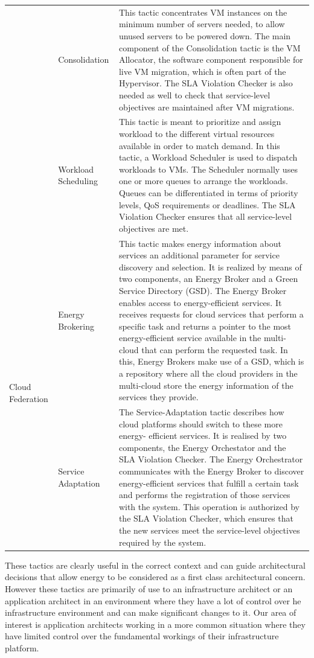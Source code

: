 \begin{small}
\begin{longtable}{| l | l | p{8cm} |}
& Consolidation & This tactic concentrates VM instances on the minimum number of servers needed, to allow unused servers to be powered down. The main component of the Consolidation tactic is the VM Allocator, the software component responsible for live VM migration, which is often part of the Hypervisor. The SLA Violation Checker is also needed as well to check that service-level objectives are maintained after VM migrations. \\ \cline{2-3}
& Workload Scheduling & This tactic is meant to prioritize and assign workload to the different virtual resources available in order to match demand. In this tactic, a Workload Scheduler is used to dispatch workloads to VMs. The Scheduler normally uses one or more queues to arrange the workloads. Queues can be differentiated in terms of priority levels, QoS requirements or deadlines. The SLA Violation Checker ensures that all service-level objectives are met. \\
\hline
\multirow{2}{*}{Cloud Federation} & Energy Brokering & This tactic makes energy information about services an additional parameter for service discovery and selection. It is realized by means of two components, an Energy Broker and a Green Service Directory (GSD). The Energy Broker enables access to energy-efficient services. It receives requests for cloud services that perform a specific task and returns a pointer to the most energy-efficient service available in the multi-cloud that can perform the requested task. In this, Energy Brokers make use of a GSD, which is a repository where all the cloud providers in the multi-cloud store the energy information of the services they provide. \\ \cline{2-3}
& Service Adaptation & The Service-Adaptation tactic describes how cloud platforms should switch to these more energy- efficient services.  It is realised by two components, the Energy Orchestator and the SLA Violation Checker.  The Energy Orchestrator communicates with the Energy Broker to discover energy-efficient services that fulfill a certain task and performs the registration of those services with the system. This operation is authorized by the SLA Violation Checker, which ensures that the new services meet the service-level objectives required by the system. \\
\hline

\end{longtable}
\end{small}

These tactics are clearly useful in the correct context and can guide architectural decisions that allow energy to be considered as a first class architectural concern.  However these tactics are primarily of use to an infrastructure architect or an application architect in an environment where they have a lot of control over he infrastructure environment and can make significant changes to it.  Our area of interest is application architects working in a more common situation where they have limited control over the fundamental workings of their infrastructure platform.

